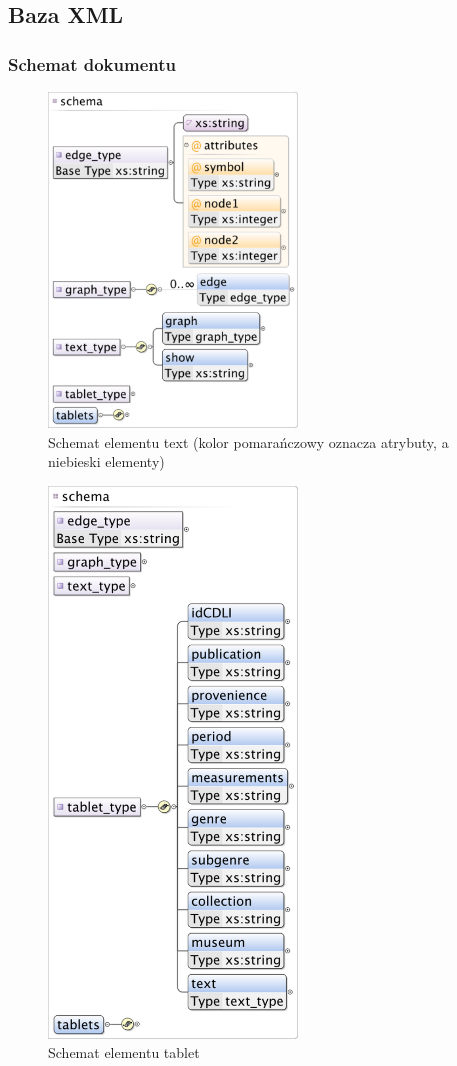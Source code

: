 \subsection{Baza XML}



\subsubsection{Schemat dokumentu}
\begin{figure}[h]
 \centering
 \includegraphics[width=250px]{../diagramy/schema_text.pdf}
 \caption{Schemat elementu text (kolor pomarańczowy oznacza atrybuty, a niebieski elementy)}
\end{figure}


\begin{figure}[h]
 \centering
 \includegraphics[width=250px]{../diagramy/schema_tablet.pdf}
 \caption{Schemat elementu tablet}
\end{figure}

